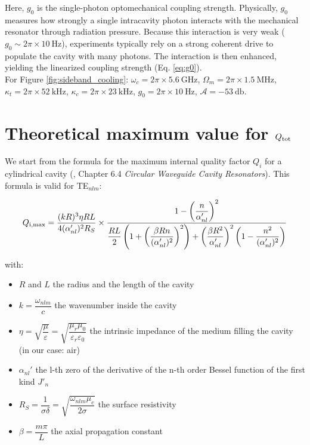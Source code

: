 \documentclass[11pt,a4pape,longbibliography]{article}
\begin{document}
Here, $g_0$ is the single-photon optomechanical coupling strength. Physically, $g_0$ measures how strongly a single intracavity photon interacts with the mechanical resonator through radiation pressure. Because this interaction is very weak ($g_0\sim2\pi\times\SI{10}{\Hz}$), experiments typically rely on a strong coherent drive to populate the cavity with many photons. The interaction is then enhanced, yielding the linearized coupling strength (Eq. \ref{eq:g0}).\\

For Figure \ref{fig:sideband_cooling}: $\omega_c=2\pi\times\SI{5.6}{\GHz}$, $\Omega_m=2\pi\times\SI{1.5}{\MHz}$, $\kappa_t=2\pi\times\SI{52}{\kHz}$, $\kappa_c=2\pi\times\SI{23}{\kHz}$, $g_0=2\pi\times\SI{10}{\Hz}$, $\mathcal{A} = \SI{-53}{\decibel}$.

\section{Theoretical maximum value for $Q_{\rm{tot}}$}
\label{apx:max_Q}

We start from the formula for the maximum internal quality factor $Q_i$ for a cylindrical cavity (\textcite{pozar_microwave_2012}, Chapter 6.4 \textit{Circular Waveguide Cavity Resonators}). This formula is valid for TE$_{nlm}$:

\begin{equation}
Q_{\rm{i,max}} = \dfrac{(kR)^3 \eta R L}{4(\alpha_{nl}')^2 R_S} \times \dfrac{1 - \left(\dfrac{n}{\alpha_{nl}'}\right)^2}{\dfrac{RL}{2}\left(1 + \left(\dfrac{\beta Rn}{(\alpha_{nl}')^2}\right)^2\right) + \left(\dfrac{\beta R^2}{\alpha_{nl}'}\right)^2\left(1 - \dfrac{n^2}{(\alpha_{nl}')^2}\right)}
\end{equation}

with:
\begin{itemize}
	\item $R$ and $L$ the radius and the length of the cavity
	\item $k=\dfrac{\omega_{nlm}}{c}$ the wavenumber inside the cavity
	\item $\eta = \sqrt{\dfrac{\mu}{\varepsilon}} = \sqrt{\dfrac{\mu_r\mu_0}{\varepsilon_r\varepsilon_0}}$ the intrinsic impedance of the medium filling the cavity (in our case: air)
	\item $\alpha_{nl}'$ the l-th zero of the derivative of the n-th order Bessel function of the first kind $J'_n$
	\item $R_S = \dfrac{1}{\sigma\delta}=\sqrt{\dfrac{\omega_{nlm}\mu_c}{2\sigma}}$ the surface resistivity
	\item $\beta=\dfrac{m\pi}{L}$ the axial propagation constant
\end{itemize}
\end{document}
